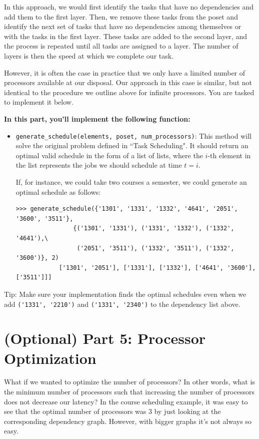 \documentclass{article}
\begin{document}
    \vspace{2mm}
    In this approach, we would first identify the tasks that have no dependencies and add them to the first layer. Then, we remove these tasks from the poset and identify the next set of tasks that have no dependencies among themselves or with the tasks in the first layer. These tasks are added to the second layer, and the process is repeated until all tasks are assigned to a layer. The number of layers is then the speed at which we complete our task.

    \vspace{2mm}    
    However, it is often the case in practice that we only have a limited number of processors available at our disposal. Our approach in this case is similar, but not identical to the procedure we outline above for infinite processors. You are tasked to implement it below.

    \begin{tcolorbox}[colback=yellow!30]
        \textbf{In this part, you'll implement the following function:}
        \begin{itemize}
            \item \lstinline{generate_schedule(elements, poset, num_processors)}:  This method will solve the original problem defined in ``Task Scheduling". It should return an optimal valid schedule in the form of a list of lists, where the $i$-th element in the list represents the jobs we should schedule at time $t = i$.

        If, for instance, we could take two courses a semester, we could generate an optimal schedule as follows:
    \begin{lstlisting}[belowskip=-10pt]
        >>> generate_schedule({'1301', '1331', '1332', '4641', '2051', '3600', '3511'},
                {('1301', '1331'), ('1331', '1332'), ('1332', '4641'),\
                 ('2051', '3511'), ('1332', '3511'), ('1332', '3600')}, 2)
            ['1301', '2051'], ['1331'], ['1332'], ['4641', '3600'], ['3511']]]
    \end{lstlisting}
        \end{itemize}
        Tip: Make sure your implementation finds the optimal schedules even when we add \lstinline{('1331', '2210')} and \lstinline{('1331', '2340')} to the dependency list above.
        
    \end{tcolorbox}



    \section*{(Optional) Part 5: Processor Optimization}
    What if we wanted to optimize the number of processors? In other words, what is the minimum number of processors such that increasing the number of processors does not decrease our latency? In the course scheduling example, it was easy to see that the optimal number of processors was $3$ by just looking at the corresponding dependency graph. However, with bigger graphs it's not always so easy.
    
\end{document}
